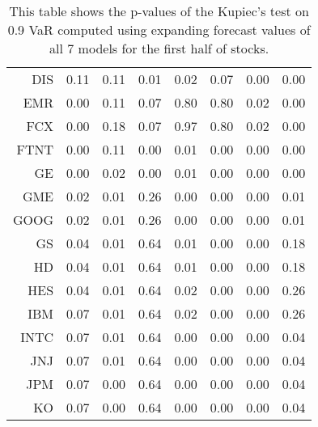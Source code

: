 \begin{table}[ht]
\begin{tabular}{rrrrrrrr}
  DIS & 0.11 & 0.11 & 0.01 & 0.02 & 0.07 & 0.00 & 0.00 \\ 
  EMR & 0.00 & 0.11 & 0.07 & 0.80 & 0.80 & 0.02 & 0.00 \\ 
  FCX & 0.00 & 0.18 & 0.07 & 0.97 & 0.80 & 0.02 & 0.00 \\ 
  FTNT & 0.00 & 0.11 & 0.00 & 0.01 & 0.00 & 0.00 & 0.00 \\ 
  GE & 0.00 & 0.02 & 0.00 & 0.01 & 0.00 & 0.00 & 0.00 \\ 
  GME & 0.02 & 0.01 & 0.26 & 0.00 & 0.00 & 0.00 & 0.01 \\ 
  GOOG & 0.02 & 0.01 & 0.26 & 0.00 & 0.00 & 0.00 & 0.01 \\ 
  GS & 0.04 & 0.01 & 0.64 & 0.01 & 0.00 & 0.00 & 0.18 \\ 
  HD & 0.04 & 0.01 & 0.64 & 0.01 & 0.00 & 0.00 & 0.18 \\ 
  HES & 0.04 & 0.01 & 0.64 & 0.02 & 0.00 & 0.00 & 0.26 \\ 
  IBM & 0.07 & 0.01 & 0.64 & 0.02 & 0.00 & 0.00 & 0.26 \\ 
  INTC & 0.07 & 0.01 & 0.64 & 0.00 & 0.00 & 0.00 & 0.04 \\ 
  JNJ & 0.07 & 0.01 & 0.64 & 0.00 & 0.00 & 0.00 & 0.04 \\ 
  JPM & 0.07 & 0.00 & 0.64 & 0.00 & 0.00 & 0.00 & 0.04 \\ 
  KO & 0.07 & 0.00 & 0.64 & 0.00 & 0.00 & 0.00 & 0.04 \\ 
   \hline
\end{tabular}
\caption[Kupiec's test p-values, alpha =0.9 (1)]{This table shows the p-values of the Kupiec's test on 0.9 VaR computed using expanding forecast values of all 7 models for the first half of stocks.} 
\label{Table:Kupiec_test_expanding_0.9_1}
\end{table}
